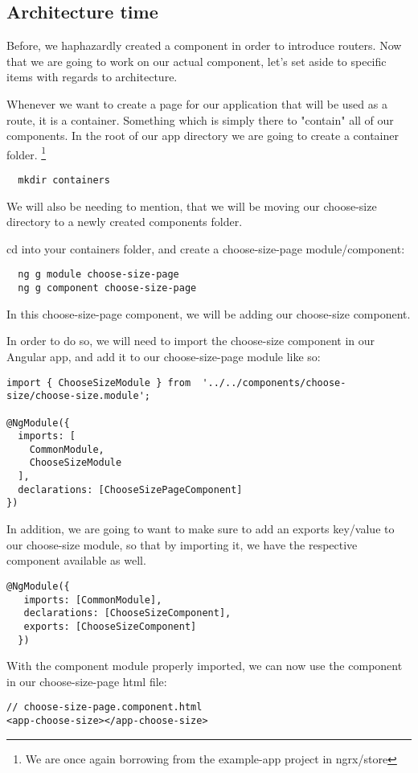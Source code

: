 \subsection{Architecture time}

Before, we haphazardly created a component in order to introduce routers. Now
that we are going to work on our actual component, let's set aside to specific
items with regards to architecture.

Whenever we want to create a page for our application that will be used as a
route, it is a container. Something which is simply there to "contain" all of
our components. In the root of our app directory we are going to create a
container folder. \footnote{We are once again borrowing from the example-app
project in ngrx/store}

\begin{verbatim}
  mkdir containers
\end{verbatim}
We will also be needing to mention, that we will be
moving our choose-size directory to a newly created components folder.

cd into your containers folder, and create a choose-size-page module/component:
\begin{verbatim}
  ng g module choose-size-page
  ng g component choose-size-page
\end{verbatim}

In this choose-size-page component, we will be adding our choose-size component.

In order to do so, we will need to import the choose-size component in our Angular
app, and add it to our choose-size-page module like so:

\begin{lstlisting}[caption=Importing the choose-size module]
import { ChooseSizeModule } from  '../../components/choose-size/choose-size.module';

@NgModule({
  imports: [
    CommonModule,
    ChooseSizeModule
  ],
  declarations: [ChooseSizePageComponent]
})
\end{lstlisting}

In addition, we are going to want to make sure to add an exports key/value to
our choose-size module, so that by importing it, we have the respective
component available as well.

\begin{lstlisting}[caption=Adding choose-size component as export]
  @NgModule({
   imports: [CommonModule],
   declarations: [ChooseSizeComponent],
   exports: [ChooseSizeComponent]
  })
\end{lstlisting}

With the component module properly imported, we can now use the component in our
choose-size-page html file:
\begin{verbatim}
// choose-size-page.component.html
<app-choose-size></app-choose-size>
\end{verbatim}
